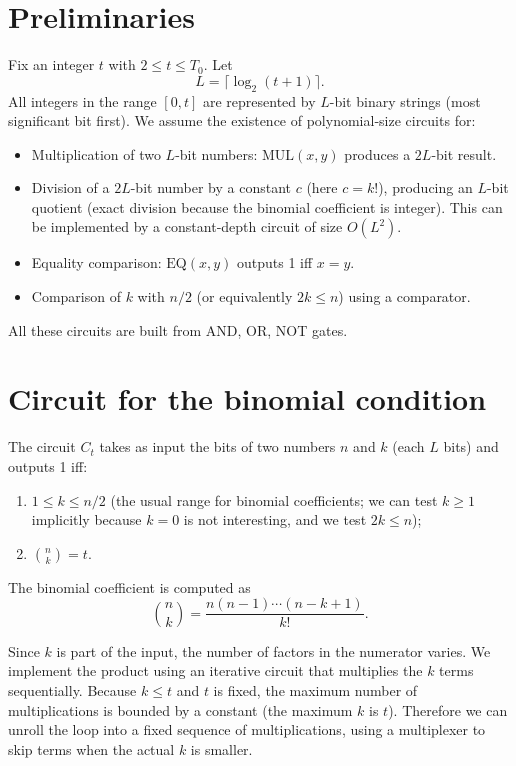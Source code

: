 \documentclass[11pt,a4paper]{article}
\begin{document}
\section{Preliminaries}

Fix an integer \(t\) with \(2 \le t \le T_0\). Let
\[
L = \lceil \log_2(t+1)\rceil.
\]
All integers in the range \([0,t]\) are represented by \(L\)-bit binary strings (most significant bit first). We assume the existence of polynomial‑size circuits for:
\begin{itemize}
\item Multiplication of two \(L\)-bit numbers: \(\mathrm{MUL}(x,y)\) produces a \(2L\)-bit result.
\item Division of a \(2L\)-bit number by a constant \(c\) (here \(c = k!\)), producing an \(L\)-bit quotient (exact division because the binomial coefficient is integer). This can be implemented by a constant‑depth circuit of size \(O(L^2)\).
\item Equality comparison: \(\mathrm{EQ}(x,y)\) outputs 1 iff \(x=y\).
\item Comparison of \(k\) with \(n/2\) (or equivalently \(2k \le n\)) using a comparator.
\end{itemize}
All these circuits are built from AND, OR, NOT gates.

\section{Circuit for the binomial condition}

The circuit \(C_t\) takes as input the bits of two numbers \(n\) and \(k\) (each \(L\) bits) and outputs 1 iff:
\begin{enumerate}
\item \(1 \le k \le n/2\) (the usual range for binomial coefficients; we can test \(k \ge 1\) implicitly because \(k=0\) is not interesting, and we test \(2k \le n\));
\item \(\binom{n}{k} = t\).
\end{enumerate}

The binomial coefficient is computed as
\[
\binom{n}{k} = \frac{n(n-1)\cdots(n-k+1)}{k!}.
\]

Since \(k\) is part of the input, the number of factors in the numerator varies. We implement the product using an iterative circuit that multiplies the \(k\) terms sequentially. Because \(k \le t\) and \(t\) is fixed, the maximum number of multiplications is bounded by a constant (the maximum \(k\) is \(t\)). Therefore we can unroll the loop into a fixed sequence of multiplications, using a multiplexer to skip terms when the actual \(k\) is smaller.
\end{document}
